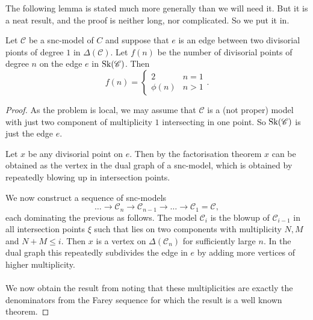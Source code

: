 
The following lemma is stated much more generally than we will need it. 
But it is a neat result, and the proof is neither long, nor complicated. So we put it in. 
\begin{lemma}\label{lem:number_divisorial_points}
	Let $\mathscr C$ be a snc-model of  $C$ and suppose that $e$ is an edge between two divisorial pionts of degree $1$ in $\Delta(\mathscr C)$. 
	Let $f(n)$ be the number of divisorial points of degree $n$ on the edge  $e$ in $\operatorname{Sk}(\mathscr C)$. 
	Then \[
		f(n) = \begin{cases}
			2 & n = 1 \\
			\phi(n) & n > 1
		\end{cases}
	.\] 
\end{lemma}
\begin{proof}
	As the problem is local, we may assume that $\mathscr C$ is a (not proper) model with just two component of multiplicity $1$ intersecting in one point. 
	So $\operatorname{Sk}(\mathscr C)$ is just the edge $e$. 

	Let $x$ be any divisorial point on $e$. 
	Then by the factorisation theorem $x$ can be obtained as the vertex in the dual graph of a snc-model, which is obtained by repeatedly blowing up in intersection points. 

	We now construct a sequence of snc-models \[
	\ldots \to 	\mathscr C_n \to \mathscr C_{n -1} \to \ldots \to \mathscr C_1 = \mathscr C
,\]
each dominating the previous as follows. 
The model  $\mathscr C_i$ is the blowup of $\mathscr C_{i-1}$ in all intersection points $\xi$ such that lies on two components with multiplicity $N, M$ and $N + M \le i$. 
Then $x$ is a vertex on $\Delta(\mathscr C_n)$ for sufficiently large $n$.
In the dual graph this repeatedly subdivides the edge in $e$ by adding more vertices of higher multiplicity. 
\\
\noindent{}
\\
We now obtain the result from noting that these multiplicities are exactly the denominators from the Farey sequence for which the result is a well known theorem. 
\end{proof}


